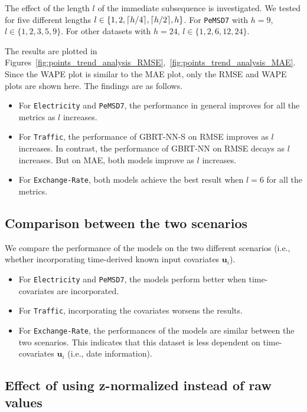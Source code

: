 The effect of the length $l$ of the immediate subsequence is investigated.
We tested for five different lengths $l \in \{ 1, 2, \lceil h/4\rceil, \lceil h/2\rceil, h\}$.
For \texttt{PeMSD7} with $h = 9$, $l \in \{1, 2, 3, 5, 9\}$.
For other datasets with $h = 24$, $l \in \{1, 2, 6, 12, 24\}$.


The results are plotted in Figures~\ref{fig:points_trend_analysis_RMSE},~\ref{fig:points_trend_analysis_MAE}.
Since the WAPE plot is similar to the MAE plot, only the RMSE and WAPE plots are shown here.
The findings are as follows.

\begin{itemize}
    \item For \texttt{Electricity} and \texttt{PeMSD7}, the performance in general improves for all the metrics as $l$ increases.
    \item For \texttt{Traffic}, the performance of \textsf{GBRT-NN-S} on RMSE improves as $l$ increases. In contrast, the performance of \textsf{GBRT-NN} on RMSE decays as $l$ increases. 
    But on MAE, both models improve as $l$ increases.
    \item For \texttt{Exchange-Rate}, both models achieve the best result when $l = 6$ for all the metrics.
\end{itemize}

\subsection{Comparison between the two scenarios} %

We compare the performance of the models on the two different scenarios (i.e., whether incorporating time-derived known input covariates $\bm{u}_i$).

\begin{itemize}
    \item For \texttt{Electricity} and \texttt{PeMSD7}, the models perform better when time-covariates are incorporated.
    \item For \texttt{Traffic}, incorporating the covariates worsens the results.
    \item For \texttt{Exchange-Rate}, the performances of the models are similar between the two scenarios. This indicates that this dataset is less dependent on time-covariates $\bm{u}_i$ (i.e., date information).
\end{itemize}

\subsection{Effect of using z-normalized instead of raw values} %

